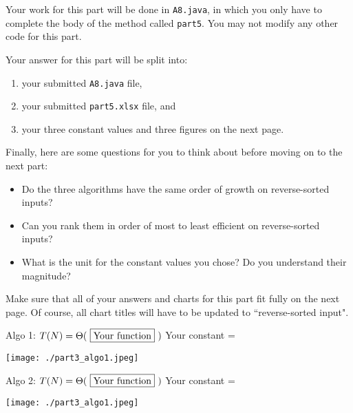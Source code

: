 \documentclass[12pt]{article}
\begin{document}
\begin{enumerate}
{  Your work for this part will be done in {\tt A8.java}, in which you only
  have to complete the body of the method called {\tt part5}. You may not
  modify any other code for this part.

 Your answer for this part will be split into:
 \begin{enumerate}
 \item your submitted {\tt A8.java} file,
 \item your submitted {\tt part5.xlsx} file, and
 \item your three constant values and three figures on the next page.
 \end{enumerate}

 Finally, here are some questions for you to think about before moving on to the
 next part:

 \begin{itemize}
     \item Do the three algorithms have the same order of growth on
     reverse-sorted inputs?
     \item Can you rank them in order of most to least efficient on
     reverse-sorted inputs?
     \item What is the unit for the constant values you chose? Do you understand
     their magnitude?
   \end{itemize}

   Make sure that all of your answers and charts for this part fit fully on the
   next page. Of course, all chart titles will have to be updated to
  ``reverse-sorted input".

   \newpage


   Algo 1: $T(N) =\Theta(\ \fbox{\color{black}{Your function}}\ )$
   \hfill Your constant =  \fbox{\color{black}{Your value}}

   \centerline{\texttt{[image: ./part3\_algo1.jpeg]}}


    Algo 2: $T(N) =\Theta(\ \fbox{\color{black}{Your function}}\ )$
    \hfill Your constant =  \fbox{\color{black}{Your value}}

   \centerline{\texttt{[image: ./part3\_algo1.jpeg]}}

}
\end{enumerate}
\end{document}
